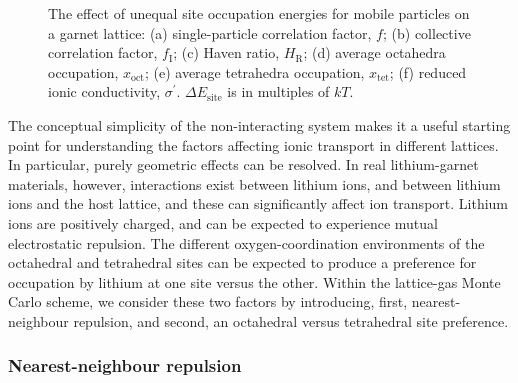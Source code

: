 \documentclass[aps,prb,twocolumn,superscriptaddress,reprint]{revtex4-1}
\newcommand{\m}[1]{\mathrm{#1}}
\begin{document}
\begin{figure}[tb]
  \centering
    \caption{\label{fig:site_energies_data}The effect of unequal site occupation energies for mobile particles on a garnet lattice: (a) single-particle correlation factor, $f$; (b) collective correlation factor, $f_\m{I}$; (c) Haven ratio, $H_\m{R}$; (d) average octahedra occupation, $x_\m{oct}$; (e) average tetrahedra occupation, $x_\m{tet}$; (f) reduced ionic conductivity, $\sigma^\prime$. $\Delta E_\m{site}$ is in multiples of $kT$.}
\end{figure}

The conceptual simplicity of the non-interacting system makes it a useful starting point for understanding the factors affecting ionic transport in different lattices. In particular, purely geometric effects can be resolved.
In real lithium-garnet materials, however, interactions exist between lithium ions, and between lithium ions and the host lattice, and these can significantly affect ion transport. 
Lithium ions are positively charged, and can be expected to experience mutual electrostatic repulsion. The different oxygen-coordination environments of the octahedral and tetrahedral sites can be expected to produce a preference for occupation by lithium at one site versus the other.\cite{WangEtAl_NatMater2015} 
Within the lattice-gas Monte Carlo scheme, we consider these two factors by introducing, first, nearest-neighbour repulsion, and second, an octahedral versus tetrahedral site preference.

\subsubsection{Nearest-neighbour repulsion}
\end{document}
